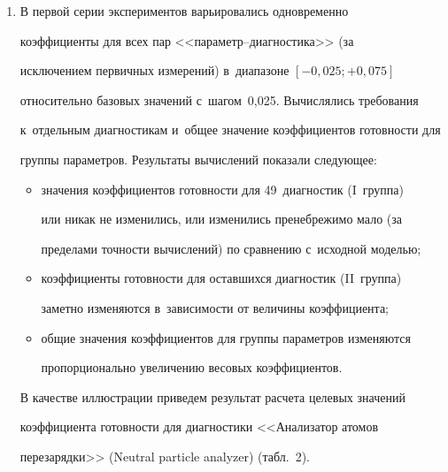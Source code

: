 \begin{enumerate}[1.]


\item В первой серии экспериментов варьировались одновременно 


коэффициенты для всех пар <<па\-ра\-метр--диаг\-но\-сти\-ка>> (за 


исключением первичных измерений) в~диапазоне $[-0{,}025; +0{,}075]$ 


относительно базовых значений с~шагом~0,025. Вы\-чис\-ля\-лись требования 


к~отдельным диагностикам и~общее значение коэффициентов го\-тов\-ности для 


группы па\-ра\-мет\-ров. Результаты вы\-чис\-ле\-ний показали сле\-ду\-ющее: 


\begin{itemize}


\item значения коэффициентов готовности для 49~диагностик (I~группа) 


или никак не изменились, или изменились пренебрежимо мало (за 


пределами точ\-ности вы\-чис\-ле\-ний) по сравнению с~исходной моделью; 


\item коэффициенты готовности для оставшихся диагностик (II~группа) 


заметно изменяются в~за\-ви\-си\-мости от величины коэффициента; 


\item общие значения коэффициентов для группы па\-ра\-мет\-ров изменяются 


пропорционально увеличению весовых коэффициентов.


\end{itemize}





В качестве иллюстрации приведем результат расчета целевых значений 


коэффициента го\-тов\-ности для диагностики <<Анализатор атомов 


перезарядки>> (Neutral particle analyzer) (табл.~2).





\begin{table}\small %


\begin{center}


\parbox{73mm}{}
\end{center}
\end{table}
\end{enumerate}
